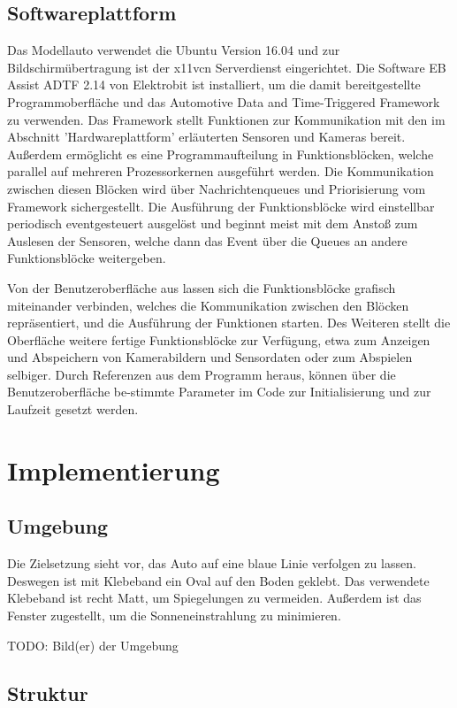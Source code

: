 \documentclass[12pt,a4paper]{report}
\begin{document}
\section{Softwareplattform}
Das Modellauto verwendet die Ubuntu Version 16.04 und zur Bildschirmübertragung ist der x11vcn Serverdienst eingerichtet. Die Software EB Assist ADTF 2.14 von Elektrobit ist installiert, um die damit bereitgestellte Programmoberfläche und das Automotive Data and Time-Triggered Framework zu verwenden. Das Framework stellt Funktionen zur Kommunikation mit den im Abschnitt 'Hardwareplattform' erläuterten Sensoren und Kameras bereit. Außerdem ermöglicht es eine Programmaufteilung in Funktionsblöcken, welche parallel auf mehreren Prozessorkernen ausgeführt werden. Die Kommunikation zwischen diesen Blöcken wird über Nachrichtenqueues und Priorisierung vom Framework sichergestellt. Die Ausführung der Funktionsblöcke wird einstellbar periodisch eventgesteuert ausgelöst und beginnt meist mit dem Anstoß zum Auslesen der Sensoren, welche dann das Event über die Queues an andere Funktionsblöcke weitergeben.

Von der Benutzeroberfläche aus lassen sich die Funktionsblöcke grafisch miteinander verbinden, welches die Kommunikation zwischen den Blöcken repräsentiert, und die Ausführung der Funktionen starten. Des Weiteren stellt die Oberfläche weitere fertige Funktionsblöcke zur Verfügung, etwa zum Anzeigen und Abspeichern von Kamerabildern und Sensordaten oder zum  Abspielen selbiger.
Durch Referenzen aus dem Programm heraus, können über die Benutzeroberfläche be-stimmte Parameter im Code zur Initialisierung und zur Laufzeit gesetzt werden.


\chapter{Implementierung}

\section{Umgebung}

Die Zielsetzung sieht vor, das Auto auf eine blaue Linie verfolgen zu lassen. Deswegen ist mit Klebeband ein Oval auf den Boden geklebt. Das verwendete Klebeband ist recht Matt, um Spiegelungen zu vermeiden. Außerdem ist das Fenster zugestellt, um die Sonneneinstrahlung zu minimieren.

TODO: Bild(er) der Umgebung

\section{Struktur}
\end{document}
